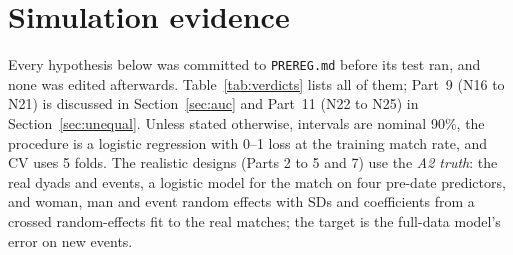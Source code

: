 \documentclass[11pt]{amsart}
\theoremstyle{plain}
\theoremstyle{definition}
\theoremstyle{remark}
\begin{document}
\section{Simulation evidence}\label{sec:sim}

Every hypothesis below was committed to \texttt{PREREG.md} before its test ran, and none was edited afterwards. Table~\ref{tab:verdicts} lists all of them; Part~9 (N16 to N21) is discussed in Section~\ref{sec:auc} and Part~11 (N22 to N25) in Section~\ref{sec:unequal}. Unless stated otherwise, intervals are nominal 90\%, the procedure is a logistic regression with 0--1 loss at the training match rate, and CV uses 5 folds. The realistic designs (Parts 2 to 5 and 7) use the \emph{A2 truth}: the real dyads and events, a logistic model for the match on four pre-date predictors, and woman, man and event random effects with SDs and coefficients from a crossed random-effects fit to the real matches; the target is the full-data model's error on new events.
\end{document}
